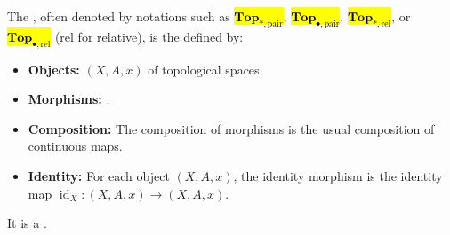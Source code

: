 \begin{definition} \label{definition:category_of_pointed_pairs_of_topological_spaces}
The , often denoted by notations such as \hl{$\mathbf{Top}_{*, \text{pair}}$}, \hl{$\mathbf{Top}_{\bullet, \text{pair}}$}, \hl{$\mathbf{Top}_{*, \text{rel}}$}, or \hl{$\mathbf{Top}_{\bullet, \text{rel}}$} ($\text{rel}$ for relative), is the  defined by:
\begin{itemize}
    \item \textbf{Objects:}  $(X, A, x)$ of topological spaces.
    \item \textbf{Morphisms:} .
    \item \textbf{Composition:} The composition of morphisms is the usual composition of continuous maps.
    \item \textbf{Identity:} For each object $(X, A, x)$, the identity morphism is the identity map $\operatorname{id}_X: (X, A, x) \to (X, A, x)$.
\end{itemize}
It is a .
\end{definition}